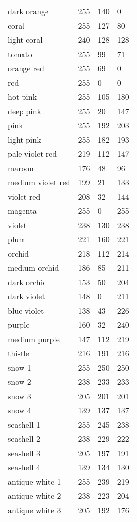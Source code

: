 \begin{center}
\begin{tabular}{llll}
  dark orange & 255 & 140 & 0  \\
  coral & 255 & 127 & 80  \\
  light coral & 240 & 128 & 128  \\
  tomato & 255 & 99 & 71  \\
  orange red & 255 & 69 & 0  \\
  red & 255 & 0 & 0  \\
  hot pink & 255 & 105 & 180  \\
  deep pink & 255 & 20 & 147  \\
  pink & 255 & 192 & 203  \\
  light pink & 255 & 182 & 193  \\
  pale violet red & 219 & 112 & 147  \\
  maroon & 176 & 48 & 96  \\
  medium violet red & 199 & 21 & 133  \\
  violet red & 208 & 32 & 144  \\
  magenta & 255 & 0 & 255  \\
  violet & 238 & 130 & 238  \\
  plum & 221 & 160 & 221  \\
  orchid & 218 & 112 & 214  \\
  medium orchid & 186 & 85 & 211  \\
  dark orchid & 153 & 50 & 204  \\
  dark violet & 148 & 0 & 211  \\
  blue violet & 138 & 43 & 226  \\
  purple & 160 & 32 & 240  \\
  medium purple & 147 & 112 & 219  \\
  thistle & 216 & 191 & 216  \\
  snow 1 & 255 & 250 & 250  \\
  snow 2 & 238 & 233 & 233  \\
  snow 3 & 205 & 201 & 201  \\
  snow 4 & 139 & 137 & 137  \\
  seashell 1 & 255 & 245 & 238  \\
  seashell 2 & 238 & 229 & 222  \\
  seashell 3 & 205 & 197 & 191  \\
  seashell 4 & 139 & 134 & 130  \\
  antique white 1 & 255 & 239 & 219  \\
  antique white 2 & 238 & 223 & 204  \\
  antique white 3 & 205 & 192 & 176  \\

\end{tabular}
\end{center}

